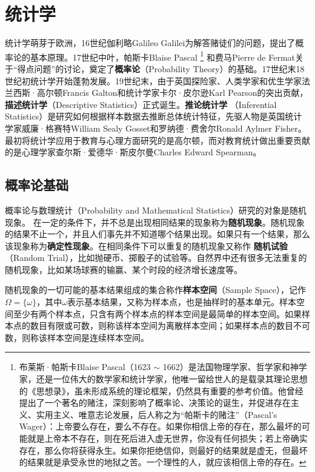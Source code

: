 \chapter{统计学}
统计学萌芽于欧洲，16世纪伽利略Galileo Galilei为解答赌徒们的问题，提出了概率论的基本原理。17世纪中叶，帕斯卡Blaise Pascal
\footnote{布莱斯·帕斯卡Blaise Pascal（1623 $\sim$ 1662）是法国物理学家、哲学家和神学家，还是一位伟大的数学家和统计学家，他唯一留给世人的是载录其理论思想的《思想录》，虽未形成系统的理论框架，仍然具有重要的参考价值。他曾经提出了一个著名的赌注，深刻影响了概率论、决策论的诞生，并促进存在主义、实用主义、唯意志论发展，后人称之为“帕斯卡的赌注”（Pascal's Wager）：上帝要么存在，要么不存在。如果你相信上帝的存在，那么最坏的可能就是上帝本不存在，则在死后进入虚无世界，你没有任何损失；若上帝确实存在，那么你将获得永生。如果你拒绝信仰，则最好的结果就是虚无，但最坏的结果就是承受永世的地狱之苦。一个理性的人，就应该相信上帝的存在。}
和费马Pierre de Fermat关于“得点问题”的讨论，奠定了\textbf{概率论}（Probability Theory）的基础。17世纪末18世纪初统计学开始蓬勃发展。19世纪末，由于英国探险家、人类学家和优生学家法兰西斯·高尔顿Francis Galton和统计学家卡尔·皮尔逊Karl Pearson的突出贡献，\textbf{描述统计学}（Descriptive Statistics）正式诞生。\textbf{推论统计学}
（Inferential Statistics）是研究如何根据样本数据去推断总体统计特征，先驱人物是英国统计学家威廉·格赛特William Sealy Gosset和罗纳德·费舍尔Ronald Aylmer Fisher。最初将统计学应用于教育与心理方面研究的是高尔顿，而对教育统计做出重要贡献的是心理学家查尔斯·爱德华·斯皮尔曼Charles Edward Spearman。

\ornamento

\section{概率论基础}
概率论与数理统计（Probability and Mathematical Statistics）研究的对象是随机现象。
在一定的条件下，并不总是出现相同结果的现象称为\textbf{随机现象}。随机现象的结果不止一个，并且人们事先并不知道哪个结果出现。如果只有一个结果，那么该现象称为\textbf{确定性现象}。在相同条件下可以重复的随机现象又称作
\textbf{随机试验}（Random Trial），比如抛硬币、掷骰子的试验等。自然界中还有很多无法重复的随机现象，比如某场球赛的输赢、某个时段的经济增长速度等。

随机现象的一切可能的基本结果组成的集合称作\textbf{样本空间}（Sample Space），记作$\Omega=\{\omega\}$，其中$\omega$表示基本结果，又称为样本点，也是抽样时的基本单元。样本空间至少有两个样本点，只含有两个样本点的样本空间是最简单的样本空间。如果样本点的数目有限或可数，则称该样本空间为离散样本空间；如果样本点的数目不可数，则称该样本空间是连续样本空间。


